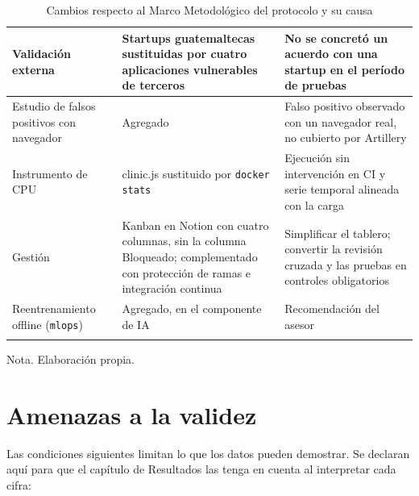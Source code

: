\begin{longtable}{|L{3.4cm}|L{4.3cm}|L{5.1cm}|}
Validación externa & Startups guatemaltecas sustituidas por cuatro aplicaciones vulnerables de terceros & No se concretó un acuerdo con una startup en el período de pruebas \\ \hline
Estudio de falsos positivos con navegador & Agregado & Falso positivo observado con un navegador real, no cubierto por Artillery \\ \hline
Instrumento de CPU & clinic.js sustituido por \texttt{docker stats} & Ejecución sin intervención en CI y serie temporal alineada con la carga \\ \hline
Gestión & Kanban en Notion con cuatro columnas, sin la columna Bloqueado; complementado con protección de ramas e integración continua & Simplificar el tablero; convertir la revisión cruzada y las pruebas en controles obligatorios \\ \hline
Reentrenamiento offline (\texttt{mlops}) & Agregado, en el componente de IA & Recomendación del asesor \\ \hline
\caption[Cambios respecto al Marco Metodológico del protocolo]{Cambios respecto al Marco Metodológico del protocolo y su causa}
\label{tab:met-cambios}
\end{longtable}
{\footnotesize Nota. Elaboración propia.}

\section{Amenazas a la validez}
\label{sec:met-validez}

Las condiciones siguientes limitan lo que los datos pueden demostrar. Se declaran aquí para que
el capítulo de Resultados las tenga en cuenta al interpretar cada cifra:

